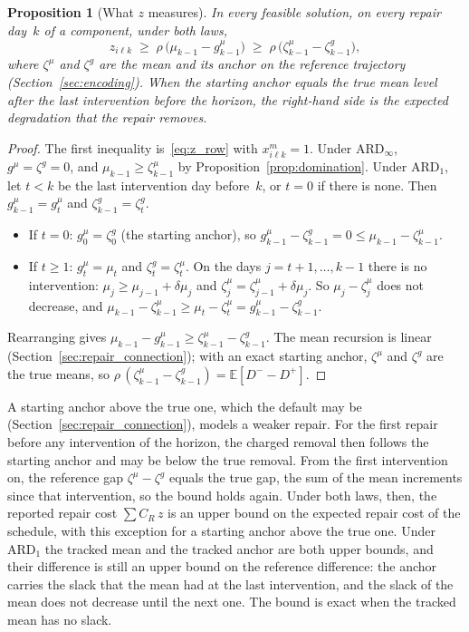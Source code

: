 \documentclass[11pt,a4paper]{article}
\theoremstyle{plain}
\newtheorem{proposition}[theorem]{Proposition}
\theoremstyle{definition}
\theoremstyle{remark}
\begin{document}
\begin{proposition}[What $z$ measures]\label{prop:repair_cost}
In every feasible solution, on every repair day~$k$ of a component, under both laws,
\[
  z_{i\ell k} \;\ge\; \rho\,\bigl(\mu_{k-1} - g^{\mu}_{k-1}\bigr) \;\ge\; \rho\,\bigl(\zeta^{\mu}_{k-1} - \zeta^{g}_{k-1}\bigr),
\]
where $\zeta^{\mu}$ and $\zeta^{g}$ are the mean and its anchor on the reference trajectory (Section~\ref{sec:encoding}).
When the starting anchor equals the true mean level after the last intervention before the horizon, the right-hand side is the expected degradation that the repair removes.
\end{proposition}
\begin{proof}
The first inequality is~\eqref{eq:z_row} with $x^m_{i\ell k} = 1$.
Under $\text{ARD}_\infty$, $g^{\mu} = \zeta^{g} = 0$, and $\mu_{k-1} \ge \zeta^{\mu}_{k-1}$ by Proposition~\ref{prop:domination}.
Under $\text{ARD}_1$, let $t < k$ be the last intervention day before~$k$, or $t = 0$ if there is none.
Then $g^{\mu}_{k-1} = g^{\mu}_t$ and $\zeta^{g}_{k-1} = \zeta^{g}_t$.
\begin{itemize}[nosep]
  \item If $t = 0$: $g^{\mu}_0 = \zeta^{g}_0$ (the starting anchor), so $g^{\mu}_{k-1} - \zeta^{g}_{k-1} = 0 \le \mu_{k-1} - \zeta^{\mu}_{k-1}$.
  \item If $t \ge 1$: $g^{\mu}_t = \mu_t$ and $\zeta^{g}_t = \zeta^{\mu}_t$.
    On the days $j = t+1, \ldots, k-1$ there is no intervention: $\mu_j \ge \mu_{j-1} + \delta\mu_j$ and $\zeta^{\mu}_j = \zeta^{\mu}_{j-1} + \delta\mu_j$.
    So $\mu_j - \zeta^{\mu}_j$ does not decrease, and $\mu_{k-1} - \zeta^{\mu}_{k-1} \ge \mu_t - \zeta^{\mu}_t = g^{\mu}_{k-1} - \zeta^{g}_{k-1}$.
\end{itemize}
Rearranging gives $\mu_{k-1} - g^{\mu}_{k-1} \ge \zeta^{\mu}_{k-1} - \zeta^{g}_{k-1}$.
The mean recursion is linear (Section~\ref{sec:repair_connection}); with an exact starting anchor, $\zeta^{\mu}$ and $\zeta^{g}$ are the true means, so $\rho\,(\zeta^{\mu}_{k-1} - \zeta^{g}_{k-1}) = \mathbb{E}[D^- - D^+]$.
\end{proof}

A starting anchor above the true one, which the default may be (Section~\ref{sec:repair_connection}), models a weaker repair.
For the first repair before any intervention of the horizon, the charged removal then follows the starting anchor and may be below the true removal.
From the first intervention on, the reference gap $\zeta^{\mu} - \zeta^{g}$ equals the true gap, the sum of the mean increments since that intervention, so the bound holds again.
Under both laws, then, the reported repair cost $\sum C_R\, z$ is an upper bound on the expected repair cost of the schedule, with this exception for a starting anchor above the true one.
Under $\text{ARD}_1$ the tracked mean and the tracked anchor are both upper bounds, and their difference is still an upper bound on the reference difference: the anchor carries the slack that the mean had at the last intervention, and the slack of the mean does not decrease until the next one.
The bound is exact when the tracked mean has no slack.
\end{document}

